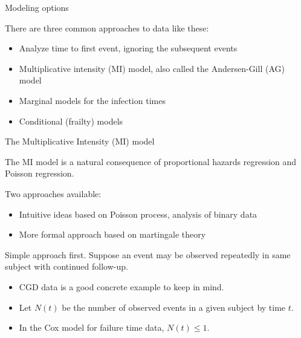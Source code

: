 \documentclass[ignorenonframetext,]{beamer}
\begin{document}
\begin{frame}{%
\protect\hypertarget{modeling-options}{%
Modeling options}}

There are three common approaches to data like these:

\begin{itemize}
\item
  Analyze time to first event, ignoring the subsequent events
\item
  Multiplicative intensity (MI) model, also called the Andersen-Gill
  (AG) model
\item
  Marginal models for the infection times
\item
  Conditional (frailty) models
\end{itemize}

\end{frame}

\begin{frame}{%
\protect\hypertarget{the-multiplicative-intensity-mi-model}{%
The Multiplicative Intensity (MI) model}}

The MI model is a natural consequence of proportional hazards regression
and Poisson regression.

Two approaches available:

\begin{itemize}
\item
  Intuitive ideas based on Poisson process, analysis of binary data
\item
  More formal approach based on martingale theory
\end{itemize}

Simple approach first. Suppose an event may be observed repeatedly in
same subject with continued follow-up.

\begin{itemize}
\item
  CGD data is a good concrete example to keep in mind.
\item
  Let \(N(t)\) be the number of observed events in a given subject by
  time \(t\).
\item
  In the Cox model for failure time data, \(N(t) \leq 1\).
\end{itemize}

\end{frame}
\end{document}

